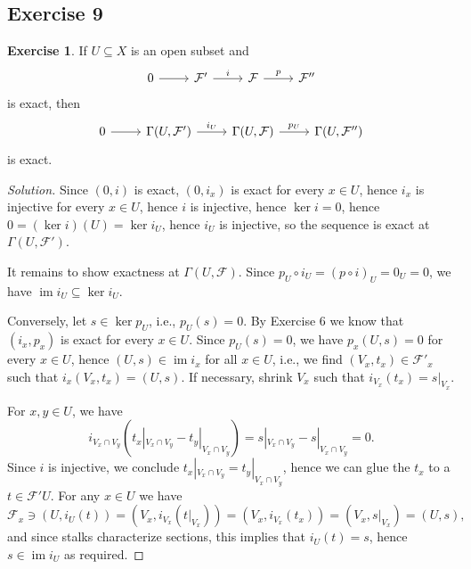\documentclass[a4paper]{amsbook}
\theoremstyle{definition}
\newtheorem*{exercise*}{Exercise}
\DeclareMathOperator\im{im}
\begin{document}
\subsection*{Exercise 9}
\label{Ex9}
\begin{exercise*}
\label{SectionsLeftExact}
If $U \subseteq X$ is an open subset and
\[\begin{tikzcd}
	0 \arrow[r] & \mathcal{F}' \arrow[r, "i"] & \mathcal{F} \arrow[r, "p"] & \mathcal{F}''
\end{tikzcd}\]
is exact, then
\[\begin{tikzcd}
	0 \arrow[r] & \Gamma(U, \mathcal{F}') \arrow[r, "i_U"] & \Gamma(U, \mathcal{F}) \arrow[r, "p_U"] & \Gamma(U, \mathcal{F}'')
\end{tikzcd}\]
is exact.
\end{exercise*}
\begin{proof}[Solution]
Since $(0, i)$ is exact, $(0, i_x)$ is exact for every $x \in U$, hence
$i_x$ is injective for every $x \in U$, hence $i$ is injective, hence
$\ker i = 0$, hence $0 = (\ker i)(U) = \ker i_U$, hence $i_U$ is injective,
so the sequence is exact at $\Gamma(U, \mathcal{F}')$.

It remains to show exactness at $\Gamma(U, \mathcal{F})$. Since
$p_U \circ i_U = (p \circ i)_U = 0_U = 0$, we have
$\im i_U \subseteq \ker i_U$.

Conversely, let $s \in \ker p_U$, i.e., $p_U(s) = 0$. By Exercise 6 we know
that $(i_x, p_x)$ is exact for every $x \in U$. Since $p_U(s) = 0$, we have
$p_x(U, s) = 0$ for every $x \in U$, hence $(U, s) \in \im i_x$ for all $x \in U$,
i.e., we find $(V_x, t_x) \in \mathcal{F}'_x$ such that $i_x(V_x, t_x) = (U, s)$.
If necessary, shrink $V_x$ such that $i_{V_x}(t_x) = s|_{V_x}$.

For $x, y \in U$, we have
\[ i_{V_x\cap V_y}(t_x|_{V_x\cap V_y} - t_y|_{V_x\cap V_y}) = s|_{V_x\cap V_y} - s|_{V_x\cap V_y} = 0. \]
Since $i$ is injective, we conclude $t_x|_{V_x\cap V_y} = t_y|_{V_x\cap V_y}$, hence
we can glue the $t_x$ to a $t \in \mathcal{F}'U$. For any $x \in U$ we have
\[ \mathcal{F}_x\ni (U, i_U(t)) = (V_x, i_{V_x}(t|_{V_x})) = (V_x, i_{V_x}(t_x))
	= (V_x, s|_{V_x}) = (U, s), \]
and since stalks characterize sections, this implies that $i_U(t) = s$, hence
$s \in \im i_U$ as required.
\end{proof}
\end{document}
